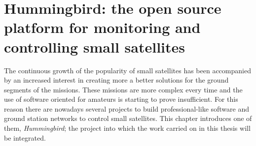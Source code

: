 
\chapter{Hummingbird: the open source platform for monitoring and controlling small satellites}\label{chapter3}

The continuous growth of the popularity of small satellites has been accompanied by an increased interest in creating more a better solutions for the ground segments of the missions. These missions are more complex every time and the use of software oriented for amateurs is starting to prove insufficient. For this reason there are nowadays several projects to build professional-like software and ground station networks to control small satellites. This chapter introduces one of them, \emph{Hummingbird}; the project into which the work carried on in this thesis will be integrated. 

\

\newpage
